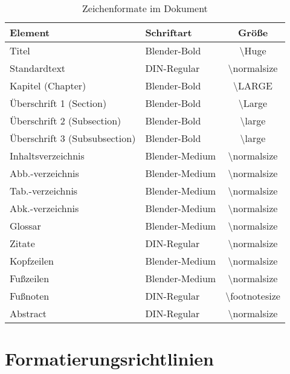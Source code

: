\begin{table}[h]
	\centering
	\caption{Zeichenformate im Dokument}
	\label{tab:zeichenformate}
	\begin{tabular}{|l|l|c|}
		\hline
		\textbf{Element}              & \textbf{Schriftart} & \textbf{Größe}              \\
		\hline
		Titel                         & Blender-Bold        & \textbackslash Huge         \\
		Standardtext                  & DIN-Regular         & \textbackslash normalsize   \\
		Kapitel (Chapter)             & Blender-Bold        & \textbackslash LARGE        \\
		Überschrift 1 (Section)       & Blender-Bold        & \textbackslash Large        \\
		Überschrift 2 (Subsection)    & Blender-Bold        & \textbackslash large        \\
		Überschrift 3 (Subsubsection) & Blender-Bold        & \textbackslash large        \\
		\hline
		Inhaltsverzeichnis            & Blender-Medium      & \textbackslash normalsize   \\
		Abb.-verzeichnis              & Blender-Medium      & \textbackslash normalsize   \\
		Tab.-verzeichnis              & Blender-Medium      & \textbackslash normalsize   \\
		Abk.-verzeichnis              & Blender-Medium      & \textbackslash normalsize   \\
		Glossar                       & Blender-Medium      & \textbackslash normalsize   \\
		\hline
		Zitate                        & DIN-Regular         & \textbackslash normalsize   \\
		Kopfzeilen                    & Blender-Medium      & \textbackslash normalsize   \\
		Fußzeilen                     & Blender-Medium      & \textbackslash normalsize   \\
		Fußnoten                      & DIN-Regular         & \textbackslash footnotesize \\
		Abstract                      & DIN-Regular         & \textbackslash normalsize   \\
		\hline
	\end{tabular}
\end{table}

\section{Formatierungsrichtlinien}
\label{sec:formatierungsrichtlinien}

